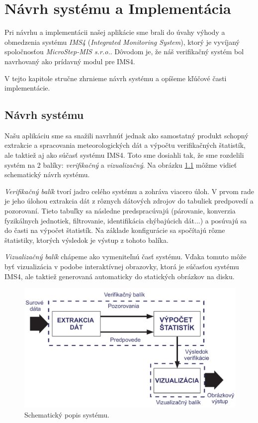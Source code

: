 \chapter{Návrh systému a Implementácia}
Pri návrhu a implementácii našej aplikácie sme brali do úvahy výhody a obmedzenia systému \textit{IMS4} (\textit{Integrated Monitoring System}), ktorý je vyvíjaný spoločnosťou \textit{MicroStep-MIS s.r.o.}. Dôvodom je, že náš verifikačný systém bol navrhovaný ako prídavný modul pre IMS4.

V tejto kapitole stručne zhrnieme návrh systému a opíšeme kľúčové časti implementácie.


\section{Návrh systému}
Našu aplikáciu sme sa snažili navrhnúť jednak ako samostatný produkt schopný extrakcie a spracovania meteorologických dát a výpočtu verifikačných štatistík, ale taktiež aj ako súčasť systému IMS4. Toto sme dosiahli tak, že sme rozdelili systém na 2 balíky: \textit{verifikačný} a \textit{vizualizačný}. Na obrázku \ref{fig:system} môžme vidieť schematický návrh systému.

\textit{Verifikačný balík} tvorí jadro celého systému a zohráva viacero úloh. V prvom rade je jeho úlohou extrakcia dát z rôznych dátových zdrojov do tabuliek predpovedí a pozorovaní. Tieto tabuľky sa následne predspracúvajú (párovanie, konverzia fyzikálnych jednotiek, filtrovanie, identifikácia chýbajúcich dát...) a posúvajú sa do časti na výpočet štatistík. Na základe konfigurácie sa spočítajú rôzne štatistiky, ktorých výsledok je výstup z tohoto balíka.

\textit{Vizualizačný balík} chápeme ako vymeniteľnú časť systému. Vďaka tomuto môže byť vizualizácia v podobe interaktívnej obrazovky, ktorá je súčasťou systému IMS4, ale taktiež generovaná automaticky do statických obrázkov na disku.

\begin{figure}
	\centering
	\includegraphics[width = 4.5in]{system}
	\caption{Schematický popis systému.}
	\label{fig:system} 
\end{figure}

